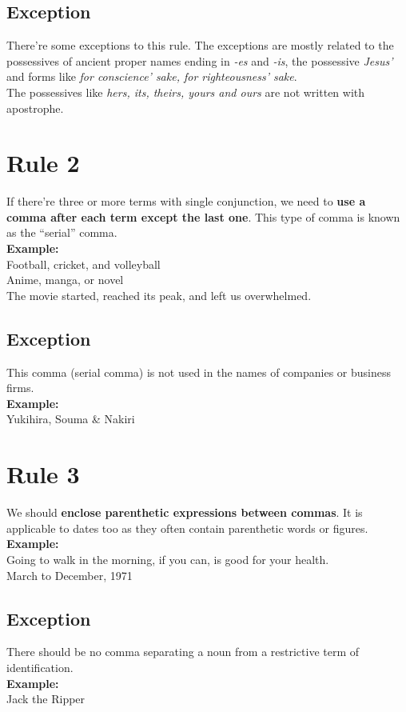 \documentclass{report}
\begin{document}
\subsection{Exception}
There're some exceptions to this rule. The exceptions are mostly related to the possessives of ancient proper names ending in \textit{-es} and \textit{-is}, the possessive \textit{Jesus'} and forms like \textit{for conscience' sake, for righteousness' sake}.\\
The possessives like \textit{hers, its, theirs, yours \emph{and} ours} are not written with apostrophe.
\section{Rule 2}
If there're three or more terms with single conjunction, we need to \textbf{use a comma after each term except the last one}. This type of comma is known as the ``serial'' comma.\\
\textbf{Example:}\\
Football, cricket, and volleyball\\
Anime, manga, or novel\\
The movie started, reached its peak, and left us overwhelmed.\\
\subsection{Exception}
This comma (serial comma) is not used in the names of companies or business firms.\\ \textbf{Example:}\\ 
Yukihira, Souma \& Nakiri

\section{Rule 3}
We should \textbf{enclose parenthetic expressions between commas}. It is applicable to dates too as they often contain parenthetic words or figures.\\
\textbf{Example:}\\
Going to walk in the morning, if you can, is good for your health.\\
March to December, 1971\\
\subsection{Exception}
There should be no comma separating a noun from a restrictive term of identification.\\
\textbf{Example:}\\
Jack the Ripper
\end{document}
